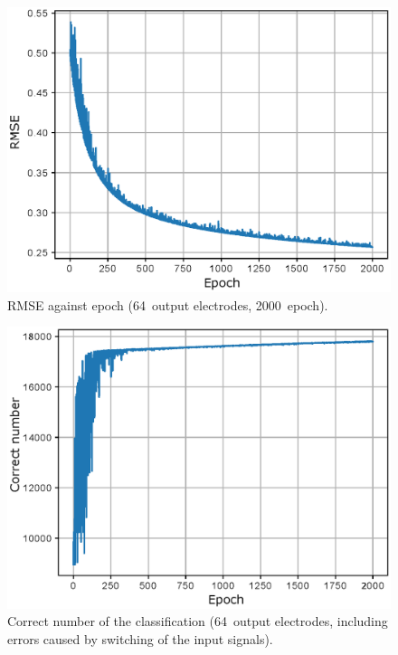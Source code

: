 \documentclass[a4j, twocolumn]{jsarticle}
\begin{document}
\begin{figure}
\centering
\includegraphics[width=1\hsize]{./figures/rmse_curvesinsqr128_32i_l_hilsinsqr128_32i_l2_hil_num_neuron64_ramdomselected_timesequence_epoch2000_batchsize128_mask10_eta30_transition0_loopnum9_r} 
\caption{RMSE against epoch (64~output electrodes, 2000~epoch).}
\label{fig:lc64}
\end{figure}

\begin{figure}
\centering
\includegraphics[width=1\hsize]{./figures/learning_curvesinsqr128_32i_l_hilsinsqr128_32i_l2_hil_num_neuron64_ramdomselected_timesequence_epoch2000_batchsize128_mask10_eta30_transition0_loopnum9_r2} 
\caption{Correct number of the classification (64~output electrodes, including errors caused by switching of the input signals).}
\label{fig:nc64}
\end{figure}
\end{document}
